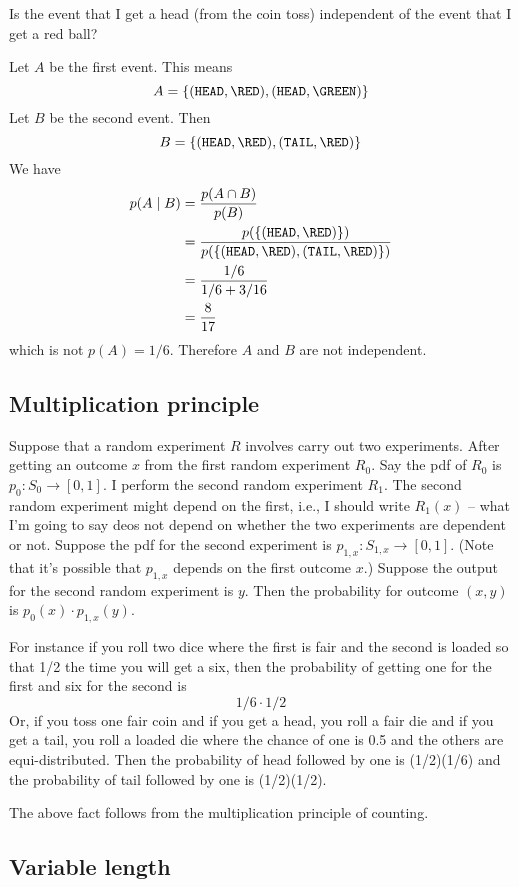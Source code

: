 Is the event that I get a head (from the coin toss) independent of the
event that I get a red ball?

Let $A$ be the first event. This means
\[
A = \{(\HEAD, \RED), (\HEAD, \GREEN)\}
\]
Let $B$ be the second event. Then
\[
B = \{(\HEAD, \RED), (\TAIL, \RED)\}
\]
We have
\begin{align*}
  p(A \mid B)
  &= \frac{ p(A \cap B) }{ p(B) } \\
  &= \frac{ p(\{(\HEAD, \RED)\}) }{p(\{(\HEAD,\RED),(\TAIL,\RED)\})} \\
  &= \frac{1/6}{1/6 + 3/16} \\
  &= \frac{8}{17}
\end{align*}
which is not $p(A) = 1/6$.
Therefore $A$ and $B$ are not independent.




\subsection{Multiplication principle}


Suppose that a random experiment $R$ involves
carry out two experiments.
After getting
an outcome $x$ from the first random experiment $R_0$.
Say the pdf of $R_0$ is $p_0 : S_0 \rightarrow [0,1]$.
I perform the second random experiment $R_1$.
The second random experiment might depend on the first,
i.e., I should write $R_1(x)$ --
what I'm going to say deos not depend on
whether the two experiments are dependent or not.
Suppose the pdf for the second experiment is
$p_{1, x} : S_{1, x} \rightarrow [0,1]$.
(Note that it's possible that $p_{1,x}$ depends on the first
outcome $x$.)
Suppose the output for the second random experiment is $y$.
Then the probability for outcome $(x, y)$
is $p_0(x) \cdot p_{1, x}(y)$.

For instance if you roll two dice where the first is fair
and the
second is loaded so that 1/2 the time you will get a six,
then the probability of getting one for the first
and six for the second
is
\[
1/6 \cdot 1/2
\]
Or, if you toss one fair coin and if you
get a head, you roll a fair die and if you get a tail,
you roll a loaded die where the chance of
one is 0.5 and the others are equi-distributed.
Then the probability of head followed by one is (1/2)(1/6)
and the probability of tail followed by one is (1/2)(1/2).

The above fact follows from the multiplication
principle of counting.



\subsection{Variable length}

